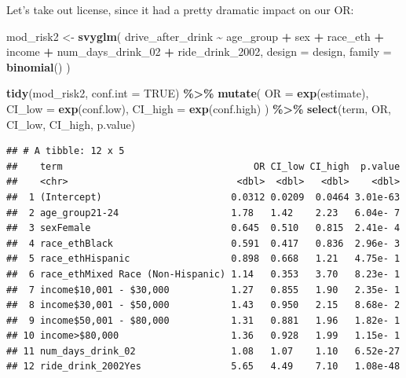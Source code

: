 \documentclass[
]{article}
\newenvironment{Shaded}{\begin{snugshade}}{\end{snugshade}}
\newcommand{\AttributeTok}[1]{\textcolor[rgb]{0.13,0.29,0.53}{#1}}
\newcommand{\ConstantTok}[1]{\textcolor[rgb]{0.56,0.35,0.01}{#1}}
\newcommand{\FunctionTok}[1]{\textcolor[rgb]{0.13,0.29,0.53}{\textbf{#1}}}
\newcommand{\NormalTok}[1]{#1}
\newcommand{\OtherTok}[1]{\textcolor[rgb]{0.56,0.35,0.01}{#1}}
\newcommand{\SpecialCharTok}[1]{\textcolor[rgb]{0.81,0.36,0.00}{\textbf{#1}}}
\begin{document}
Let's take out license, since it had a pretty dramatic impact on our OR:

\begin{Shaded}
\begin{Highlighting}[]
\NormalTok{mod\_risk2 }\OtherTok{\textless{}{-}} \FunctionTok{svyglm}\NormalTok{(}
\NormalTok{  drive\_after\_drink }\SpecialCharTok{\textasciitilde{}}\NormalTok{ age\_group }\SpecialCharTok{+}\NormalTok{ sex }\SpecialCharTok{+}\NormalTok{ race\_eth }\SpecialCharTok{+}\NormalTok{ income }\SpecialCharTok{+} 
\NormalTok{     num\_days\_drink\_02 }\SpecialCharTok{+}\NormalTok{ ride\_drink\_2002,}
  \AttributeTok{design =}\NormalTok{ design,}
  \AttributeTok{family =} \FunctionTok{binomial}\NormalTok{()}
\NormalTok{) }

\FunctionTok{tidy}\NormalTok{(mod\_risk2, }\AttributeTok{conf.int =} \ConstantTok{TRUE}\NormalTok{) }\SpecialCharTok{\%\textgreater{}\%}
  \FunctionTok{mutate}\NormalTok{(}
    \AttributeTok{OR =} \FunctionTok{exp}\NormalTok{(estimate),}
    \AttributeTok{CI\_low =} \FunctionTok{exp}\NormalTok{(conf.low),}
    \AttributeTok{CI\_high =} \FunctionTok{exp}\NormalTok{(conf.high)}
\NormalTok{  ) }\SpecialCharTok{\%\textgreater{}\%}
  \FunctionTok{select}\NormalTok{(term, OR, CI\_low, CI\_high, p.value)}
\end{Highlighting}
\end{Shaded}

\begin{verbatim}
## # A tibble: 12 x 5
##    term                                  OR CI_low CI_high  p.value
##    <chr>                              <dbl>  <dbl>   <dbl>    <dbl>
##  1 (Intercept)                       0.0312 0.0209  0.0464 3.01e-63
##  2 age_group21-24                    1.78   1.42    2.23   6.04e- 7
##  3 sexFemale                         0.645  0.510   0.815  2.41e- 4
##  4 race_ethBlack                     0.591  0.417   0.836  2.96e- 3
##  5 race_ethHispanic                  0.898  0.668   1.21   4.75e- 1
##  6 race_ethMixed Race (Non-Hispanic) 1.14   0.353   3.70   8.23e- 1
##  7 income$10,001 - $30,000           1.27   0.855   1.90   2.35e- 1
##  8 income$30,001 - $50,000           1.43   0.950   2.15   8.68e- 2
##  9 income$50,001 - $80,000           1.31   0.881   1.96   1.82e- 1
## 10 income>$80,000                    1.36   0.928   1.99   1.15e- 1
## 11 num_days_drink_02                 1.08   1.07    1.10   6.52e-27
## 12 ride_drink_2002Yes                5.65   4.49    7.10   1.08e-48
\end{verbatim}
\end{document}
